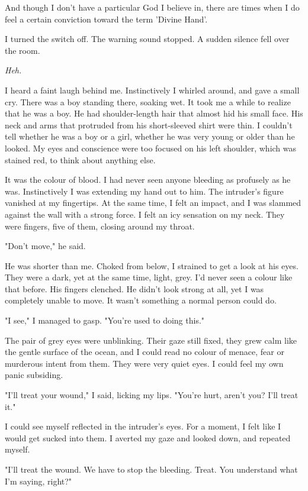 And though I don't have a particular God I believe in, there are times
when I do feel a certain conviction toward the term 'Divine Hand'.

I turned the switch off. The warning sound stopped. A sudden silence
fell over the room.

\emph{Heh.}

I heard a faint laugh behind me. Instinctively I whirled around, and
gave a small cry. There was a boy standing there, soaking wet. It took
me a while to realize that he was a boy. He had shoulder-length hair
that almost hid his small face. His neck and arms that protruded from
his short-sleeved shirt were thin. I couldn't tell whether he was a boy
or a girl, whether he was very young or older than he looked. My eyes
and conscience were too focused on his left shoulder, which was stained
red, to think about anything else.

It was the colour of blood. I had never seen anyone bleeding as
profusely as he was. Instinctively I was extending my hand out to him.
The intruder's figure vanished at my fingertips. At the same time, I
felt an impact, and I was slammed against the wall with a strong force.
I felt an icy sensation on my neck. They were fingers, five of them,
closing around my throat.

\mybreak

"Don't move," he said.

He was shorter than me. Choked from below, I strained to get a look at
his eyes. They were a dark, yet at the same time, light, grey. I'd never
seen a colour like that before. His fingers clenched. He didn't look
strong at all, yet I was completely unable to move. It wasn't something
a normal person could do.

"I see," I managed to gasp. "You're used to doing this."

The pair of grey eyes were unblinking. Their gaze still fixed, they grew
calm like the gentle surface of the ocean, and I could read no colour of
menace, fear or murderous intent from them. They were very quiet eyes. I
could feel my own panic subsiding.

"I'll treat your wound," I said, licking my lips. "You're hurt, aren't
you? I'll treat it."

I could see myself reflected in the intruder's eyes. For a moment, I
felt like I would get sucked into them. I averted my gaze and looked
down, and repeated myself.

"I'll treat the wound. We have to stop the bleeding. Treat. You
understand what I'm saying, right?"

